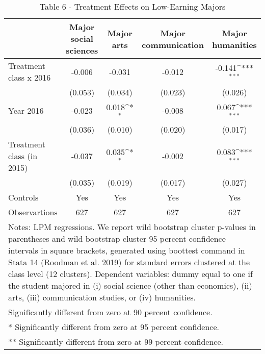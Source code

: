 \begin{table}[]
\caption{Table 6 - Treatment Effects on Low-Earning Majors}
{
\def\sym#1{\ifmmode^{#1}\else\(^{#1}\)\fi}
\begin{tabular}{@{\extracolsep{2pt}}l*{4}{c}@{}}
\hline\hline


 & Major social sciences & Major arts & Major communication & Major humanities \\
\hline
Treatment class x 2016 & -0.006 & -0.031 & -0.012 & -0.141\sym{***} \\
 & (0.053) & (0.034) & (0.023) & (0.026) \\
Year 2016 & -0.023 & 0.018\sym{*} & -0.008 & 0.067\sym{***} \\
 & (0.036) & (0.010) & (0.020) & (0.017) \\
Treatment class (in 2015) & -0.037 & 0.035\sym{*} & -0.002 & 0.083\sym{***} \\
 & (0.035) & (0.019) & (0.017) & (0.027) \\
Controls & Yes & Yes & Yes & Yes \\

\hline
Observartions & 627 & 627 & 627 & 627 \\
\hline\hline
\multicolumn{5}{l}{\footnotesize Notes: LPM regressions. We report wild bootstrap cluster p-values in parentheses and wild bootstrap cluster 95 percent                confidence intervals in square brackets, generated using boottest command in Stata 14 (Roodman et al. 2019)                for standard errors clustered at the class level (12 clusters). Dependent variables: dummy equal to one if the student                majored in (i) social science (other than economics), (ii) arts, (iii) communication studies, or (iv) humanities.}\vspace{-.25em} \\
\multicolumn{5}{l}{\footnotesize * Significantly different from zero at 90 percent confidence.}\vspace{-.25em} \\
\multicolumn{5}{l}{\footnotesize ** Significantly different from zero at 95 percent confidence.}\vspace{-.25em} \\
\multicolumn{5}{l}{\footnotesize *** Significantly different from zero at 99 percent confidence.}
\end{tabular}
}
\end{table}